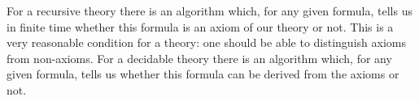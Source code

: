 

\setcounter{section}{3}
\setcounter{subsection}{5}
\setcounter{dfn}{32}


For a recursive theory there is an algorithm which, for any given formula, tells us in finite time whether this formula is an axiom of our theory or not.
This is a very reasonable condition for a theory: one should be able to distinguish axioms from non-axioms.
For a decidable theory there is an algorithm which, for any given formula, tells us whether this formula can be derived from the axioms or not.



